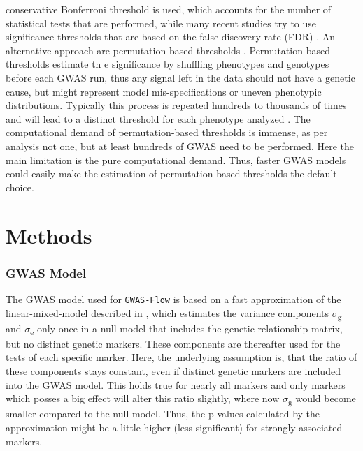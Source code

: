conservative Bonferroni threshold is used, which accounts for the number of statistical tests that are performed, while many
recent studies try to use significance thresholds that are based on the false-discovery rate (FDR) \cite{Storey9440}.
An alternative approach are permutation-based thresholds \cite{che2014adaptive}. Permutation-based thresholds estimate th
e significance by shuffling phenotypes and genotypes before each GWAS run, thus any signal left in the data should not have
a genetic cause, but might represent model mis-specifications or uneven phenotypic distributions. Typically this process is
repeated hundreds to thousands of times and will lead to a distinct threshold for each phenotype analyzed \cite{togninalli2017aragwas}.
The computational demand of permutation-based thresholds is immense, as per analysis not one, but at least hundreds of GWAS need
to be performed. Here the main limitation is the pure computational demand. Thus, faster GWAS models could easily make the
estimation of permutation-based thresholds the default choice.

\section{Methods}

\subsubsection{GWAS Model}
The GWAS model used for \texttt{GWAS-Flow} is based on a fast approximation of the linear-mixed-model described in
\cite{kang2010variance,Zhang2010}, which estimates the variance components $\sigma$\textsubscript{g} and $\sigma$\textsubscript{e}
only once in a null model that includes the genetic relationship matrix, but no distinct genetic markers. These components are
thereafter used for the tests of each specific marker. Here, the underlying assumption is, that the ratio of these components
stays constant, even if distinct genetic markers are included into the GWAS model. This holds true for nearly all markers and
only markers which posses a big effect will alter this ratio slightly, where now $\sigma$\textsubscript{g} would become smaller
compared to the null model. Thus, the p-values calculated by the approximation might be a little higher (less significant) for
strongly associated markers. 

